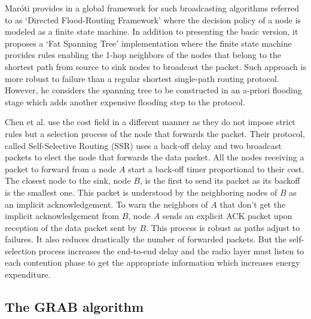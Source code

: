 \documentclass[journal, peerreview, onecolumn, draftcls]{IEEEtran}
\begin{document}
Mar\'oti provides in \cite{Maroti04} a global framework for such broadcasting algorithms referred to as `Directed Flood-Routing Framework' where the decision policy of a node is modeled as a finite state machine. In addition to presenting the basic version, it proposes a `Fat Spanning Tree' implementation where the finite state machine provides rules enabling the 1-hop neighbors of the nodes that belong to the shortest path from source to sink nodes to broadcast the packet. Such approach is more robust to failure than a regular shortest single-path routing protocol. However, he considers the spanning tree to be constructed in an a-priori flooding stage which adds another expensive flooding step to the protocol.

Chen et al. \cite{Chen05} use the cost field in a different manner as they do not impose strict rules but a selection process of the node that forwards the packet. Their protocol, called Self-Selective Routing (SSR) uses a back-off delay and two broadcast packets to elect the node that forwards the data packet. All the nodes receiving a packet to forward from a node $A$ start a back-off timer proportional to their cost. The closest node to the sink, node $B$, is the first to send its packet as its backoff is the smallest one. This packet is understood by the neighboring nodes of $B$ as an implicit acknowledgement. To warn the neighbors of $A$ that don't get the implicit acknowledgement from $B$, node $A$ sends an explicit ACK packet upon reception of the data packet sent by $B$. This process is robust as paths adjust to failures. It also reduces drastically the number of forwarded packets. But the self-selection process increases the end-to-end delay and the radio layer must listen to each contention phase to get the appropriate information which increases energy expenditure.


\subsection{The GRAB algorithm}
\end{document}
